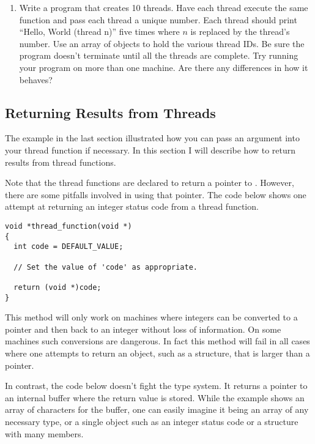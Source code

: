 \begin{enumerate}

\item Write a program that creates 10 threads. Have each thread execute the same function and
  pass each thread a unique number. Each thread should print ``Hello, World (thread n)'' five
  times where $n$ is replaced by the thread's number. Use an array of 
  objects to hold the various thread IDs. Be sure the program doesn't terminate until all the
  threads are complete. Try running your program on more than one machine. Are there any
  differences in how it behaves?

\end{enumerate}

\subsection{Returning Results from Threads}
\label{subsec:returning-results}

The example in the last section illustrated how you can pass an argument into your thread
function if necessary. In this section I will describe how to return results from thread
functions.

Note that the thread functions are declared to return a pointer to . However,
there are some pitfalls involved in using that pointer. The code below shows one attempt at
returning an integer status code from a thread function.

\begin{lstlisting}
void *thread_function(void *)
{
  int code = DEFAULT_VALUE;

  // Set the value of 'code' as appropriate.

  return (void *)code;
}
\end{lstlisting}

This method will only work on machines where integers can be converted to a pointer and then
back to an integer without loss of information. On some machines such conversions are dangerous.
In fact this method will fail in all cases where one attempts to return an object, such as a
structure, that is larger than a pointer.

In contrast, the code below doesn't fight the type system. It returns a pointer to an internal
buffer where the return value is stored. While the example shows an array of characters for the
buffer, one can easily imagine it being an array of any necessary type, or a single object such
as an integer status code or a structure with many members.

